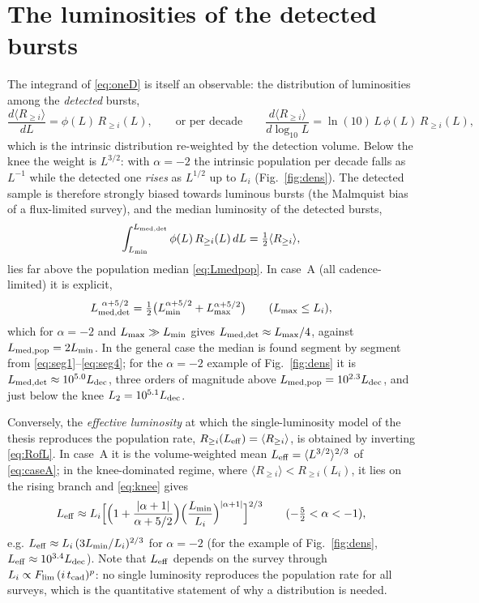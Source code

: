 \documentclass[11pt,a4paper]{article}
\newcommand{\Flim}{F_{\rm lim}}
\newcommand{\tcad}{t_{\rm cad}}
\newcommand{\Ravg}{\langle R_{\geq i}\rangle}
\newcommand{\Lmin}{L_{\rm min}}
\newcommand{\Lmax}{L_{\rm max}}
\newcommand{\Ldec}{L_{\rm dec}}
\begin{document}
\section{The luminosities of the detected bursts}
\label{sec:detected}

The integrand of \eqref{eq:oneD} is itself an observable: the distribution of luminosities among the \emph{detected} bursts,
\begin{equation}
\label{eq:dRdL}
\frac{d\Ravg}{dL}=\phi(L)\,R_{\geq i}(L),\qquad\text{or per decade}\qquad \frac{d\Ravg}{d\log_{10}L}=\ln(10)\,L\,\phi(L)\,R_{\geq i}(L),
\end{equation}
which is the intrinsic distribution re-weighted by the detection volume. Below the knee the weight is $L^{3/2}$: with $\alpha=-2$ the intrinsic population per decade falls as $L^{-1}$ while the detected one \emph{rises} as $L^{1/2}$ up to $L_i$ (Fig.~\ref{fig:dens}). The detected sample is therefore strongly biased towards luminous bursts (the Malmquist bias of a flux-limited survey), and the median luminosity of the detected bursts,
\begin{equation}
\int_{\Lmin}^{L_{\rm med,det}}\phi(L)\,R_{\geq i}(L)\,dL=\tfrac12\Ravg ,
\end{equation}
lies far above the population median \eqref{eq:Lmedpop}. In case~A (all cadence-limited) it is explicit,
\begin{equation}
\label{eq:LmedA}
L_{\rm med,det}^{\ \alpha+5/2}=\tfrac12\bigl(\Lmin^{\alpha+5/2}+\Lmax^{\alpha+5/2}\bigr)\qquad(\Lmax\le L_i),
\end{equation}
which for $\alpha=-2$ and $\Lmax\gg\Lmin$ gives $L_{\rm med,det}\approx\Lmax/4$, against $L_{\rm med,pop}=2\Lmin$. In the general case the median is found segment by segment from \eqref{eq:seg1}--\eqref{eq:seg4}; for the $\alpha=-2$ example of Fig.~\ref{fig:dens} it is $L_{\rm med,det}\approx10^{5.0}\Ldec$, three orders of magnitude above $L_{\rm med,pop}=10^{2.3}\Ldec$, and just below the knee $L_2=10^{5.1}\Ldec$.

Conversely, the \emph{effective luminosity} at which the single-luminosity model of the thesis reproduces the population rate, $R_{\geq i}(L_{\rm eff})=\Ravg$, is obtained by inverting \eqref{eq:RofL}. In case~A it is the volume-weighted mean $L_{\rm eff}=\langle L^{3/2}\rangle^{2/3}$ of \eqref{eq:caseA}; in the knee-dominated regime, where $\Ravg<R_{\geq i}(L_i)$, it lies on the rising branch and \eqref{eq:knee} gives
\begin{equation}
\label{eq:Leff}
L_{\rm eff}\approx L_i\Bigl[\Bigl(1+\frac{|\alpha+1|}{\alpha+5/2}\Bigr)\Bigl(\frac{\Lmin}{L_i}\Bigr)^{|\alpha+1|}\Bigr]^{2/3}\qquad(-\tfrac52<\alpha<-1),
\end{equation}
e.g. $L_{\rm eff}\approx L_i\,(3\Lmin/L_i)^{2/3}$ for $\alpha=-2$ (for the example of Fig.~\ref{fig:dens}, $L_{\rm eff}\approx10^{3.4}\Ldec$). Note that $L_{\rm eff}$ depends on the survey through $L_i\propto\Flim\,(i\,\tcad)^{p}$: no single luminosity reproduces the population rate for all surveys, which is the quantitative statement of why a distribution is needed.
\end{document}
